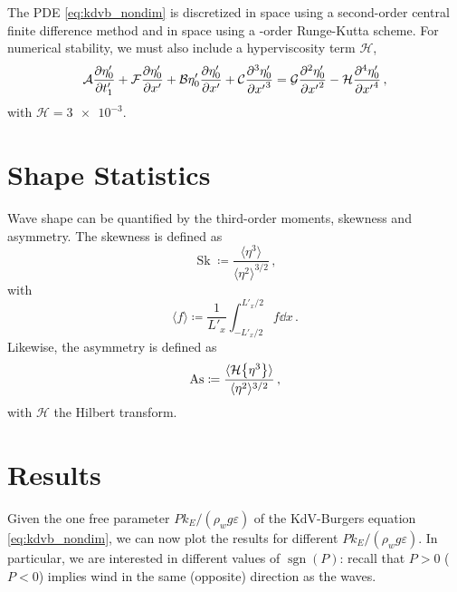 \documentclass{jfm}
\DeclareMathOperator{\sgn}{sgn}
\DeclareMathOperator{\Sk}{Sk}
\DeclareMathOperator{\As}{As}
\newcommand{\hilbert}{\mathcal{H}}
\renewcommand*{\epsilon}{\varepsilon}
\begin{document}
The PDE \cref{eq:kdvb_nondim} is discretized in space using a
second-order central finite difference method and in space using a
-order Runge-Kutta scheme.
For numerical stability, we must also include a hyperviscosity term
$\mathcal{H}$,
\begin{equation}
  \mathcal{A} \pdv{\eta'_0}{t'_1} + \mathcal{F} \pdv{\eta'_0}{x'} + \mathcal{B}
  \eta'_0 \pdv{\eta'_0}{x'} + \mathcal{C} \pdv[3]{\eta'_0}{{x'}} =
  \mathcal{G} \pdv[2]{\eta'_0}{{x'}} - \mathcal{H}
  \pdv[4]{\eta'_0}{{x'}} \,,
\end{equation}
with $\mathcal{H} = \num{3e-3}$.

\section{Shape Statistics}
Wave shape can be quantified by the third-order moments, skewness and
asymmetry.
The skewness is defined as
\begin{equation}
  \Sk \coloneqq \frac{\langle \eta^3 \rangle}{\langle \eta^2
  \rangle^{3/2}} \,,
\end{equation}
with
\begin{equation}
  \langle f \rangle \coloneqq \frac{1}{L'_x} \int_{-L'_x/2}^{L'_x/2} f
  \dd{x} \,.
\end{equation}
Likewise, the asymmetry is defined as
\begin{equation}
  \As \coloneqq \frac{\langle \hilbert \Bqty{\eta^3} \rangle}{\langle
    \eta^2 \rangle^{3/2}} \,,
\end{equation}
with $\hilbert$ the Hilbert transform.

\section{Results}
Given the one free parameter $P k_E/(\rho_w g \epsilon)$ of the
KdV-Burgers equation \cref{eq:kdvb_nondim}, we can now plot the results
for different $P k_E/(\rho_w g \epsilon)$.
In particular, we are interested in different values of $\sgn(P)$:
recall that $P>0$ ($P<0$) implies wind in the same (opposite) direction
as the waves.
\end{document}
